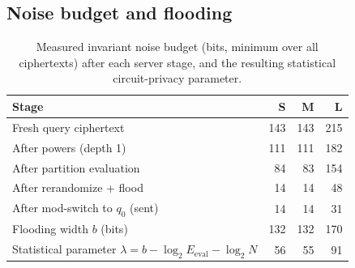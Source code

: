 \documentclass[11pt]{article}
\begin{document}
\subsection{Noise budget and flooding}\label{sec:noise}
\begin{table}[H]
\centering\small
\caption{Measured invariant noise budget (bits, minimum over all ciphertexts) after each server stage, and the resulting statistical circuit-privacy parameter.}
\label{tab:noise}
\begin{tabular}{@{}lrrr@{}}
\toprule
Stage & S & M & L \\
\midrule
Fresh query ciphertext & 143 & 143 & 215 \\
After powers (depth 1) & 111 & 111 & 182 \\
After partition evaluation & 84 & 83 & 154 \\
After rerandomize + flood & 14 & 14 & 48 \\
After mod-switch to $q_0$ (sent) & 14 & 14 & 31 \\
\midrule
Flooding width $b$ (bits) & 132 & 132 & 170 \\
Statistical parameter $\lambda=b-\log_2 E_{\mathrm{eval}}-\log_2 N$ & 56 & 55 & 91 \\
\bottomrule
\end{tabular}
\end{table}
\end{document}

